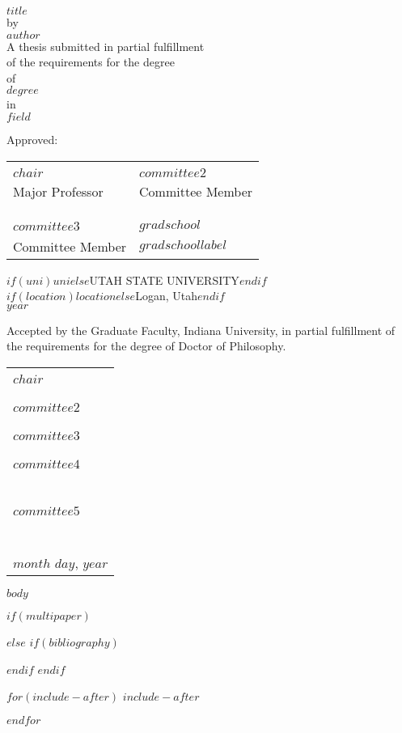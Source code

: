 \documentclass{DissertateUSU}
\renewcommand{\maketitle}{
	\thispagestyle{empty}
	\vspace*{\fill}
	\begin{center}
	\doublespaced
	\MakeUppercase{$title$}\\
	by\\
	$author$ \\
	\singlespaced
	A dissertation submitted in partial fulfillment\\
	of the requirements for the degree \\
	\doublespaced
	of\\
	\MakeUppercase{$degree$} \\
	in\\
	\singlespaced
  $field$ \\
	\end{center}

  \vspace{20pt}
    \begin{center}
	  \singlespacing
      $if(uni)$\MakeUppercase{$uni$}$else$UTAH STATE UNIVERSITY$endif$\\
	    $if(location)$$location$$else$Logan, Utah$endif$\\
	    \doublespacing
	    $month$ $year$
	  \end{center}
	\vspace*{\fill}
	\clearpage
}
\renewcommand{\maketitle}{
	\thispagestyle{empty}
	\vspace*{\fill}
	\begin{center}
	\doublespaced
	\MakeUppercase{$title$}\\
	by\\
	$author$ \\
	\singlespaced
	A thesis submitted in partial fulfillment\\
	of the requirements for the degree \\
	\doublespaced
	of\\
	\MakeUppercase{$degree$} \\
	in\\
	\singlespaced
  $field$ \\
	\end{center}

	\vspace{20pt}
	\noindent Approved: \\
	\vspace{30pt}
	\noindent
	\begin{tabular}{ll}
    \makebox[2.75in]{\hrulefill} & \makebox[2.75in]{\hrulefill}\\
    $chair$                      & $committee2$ \\
    Major Professor              & Committee Member \\
    & \\
    & \\
    \makebox[2.75in]{\hrulefill} & \makebox[2.75in]{\hrulefill}\\
    $committee3$                 & $gradschool$ \\
    Committee Member             & $gradschoollabel$ \\

    \end{tabular}

  \vspace{20pt}
    \begin{center}
	  \singlespacing
      $if(uni)$\MakeUppercase{$uni$}$else$UTAH STATE UNIVERSITY$endif$\\
	    $if(location)$$location$$else$Logan, Utah$endif$\\
	    \doublespacing
	    $year$
	  \end{center}
	\vspace*{\fill}
	\clearpage
}
\newcommand{\acceptancepage} {
\doublespacing
	\vspace{20pt}
	\noindent Accepted by the Graduate Faculty, Indiana University, in partial fulfillment of the requirements for the degree of Doctor of Philosophy. \\
	\vspace{30pt}
	\noindent
	\begin{tabular}{l}
    \makebox[2.75in]{\hrulefill} \\
    $chair$ \\
     \\
     \\
    \makebox[2.75in]{\hrulefill} \\
    $committee2$ \\
     \\
     \\
    \makebox[2.75in]{\hrulefill} \\
    $committee3$ \\
     \\
     \\
    \makebox[2.75in]{\hrulefill} \\
    $committee4$ \\\
    \\
    \\
    \makebox[2.75in]{\hrulefill} \\
    $committee5$ \\\
    \\
    \\
    \\
    $month$ $day$, $year$ \\

    \end{tabular}

}
\newcommand{\copyrightpage}{
	\vspace*{\fill}
  \begin{center}
	\doublespacing
	Copyright \hspace{3pt}
	  \scshape \small \copyright  \hspace{3pt}
	  $author$ \hspace{3pt} $year$ \\
	All Rights Reserved
  \end{center}
	\vspace*{\fill}
}
\begin{document}
\maketitle


\acceptancepage

$body$

$if(multipaper)$

$else$
$if(bibliography)$

$endif$
$endif$

$for(include-after)$
$include-after$

$endfor$
\end{document}
